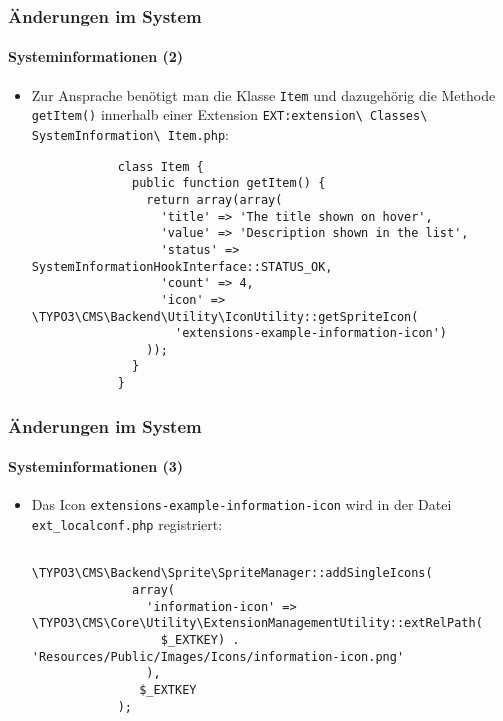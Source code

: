 \begin{frame}[fragile]
	\frametitle{Änderungen im System}
	\framesubtitle{Systeminformationen (2)}

	\lstset{basicstyle=\tiny\ttfamily}

	\begin{itemize}
		\item Zur Ansprache benötigt man die Klasse \texttt{Item} und dazugehörig die Methode
			\texttt{getItem()} innerhalb einer Extension
			\small
				\texttt{EXT:extension\textbackslash
					Classes\textbackslash
					SystemInformation\textbackslash
					Item.php}:
			\normalsize

		\begin{lstlisting}
			class Item {
			  public function getItem() {
			    return array(array(
			      'title' => 'The title shown on hover',
			      'value' => 'Description shown in the list',
			      'status' => SystemInformationHookInterface::STATUS_OK,
			      'count' => 4,
			      'icon' => \TYPO3\CMS\Backend\Utility\IconUtility::getSpriteIcon(
				    'extensions-example-information-icon')
			    ));
			  }
			}
		\end{lstlisting}

	\end{itemize}

\end{frame}

\begin{frame}[fragile]
	\frametitle{Änderungen im System}
	\framesubtitle{Systeminformationen (3)}

	\lstset{basicstyle=\tiny\ttfamily}

	\begin{itemize}
		\item Das Icon \texttt{extensions-example-information-icon} wird in der Datei \texttt{ext\_localconf.php} registriert:
		\begin{lstlisting}
			\TYPO3\CMS\Backend\Sprite\SpriteManager::addSingleIcons(
			  array(
			    'information-icon' => \TYPO3\CMS\Core\Utility\ExtensionManagementUtility::extRelPath(
			      $_EXTKEY) . 'Resources/Public/Images/Icons/information-icon.png'
			    ),
			   $_EXTKEY
			);
		\end{lstlisting}

	\end{itemize}

\end{frame}


